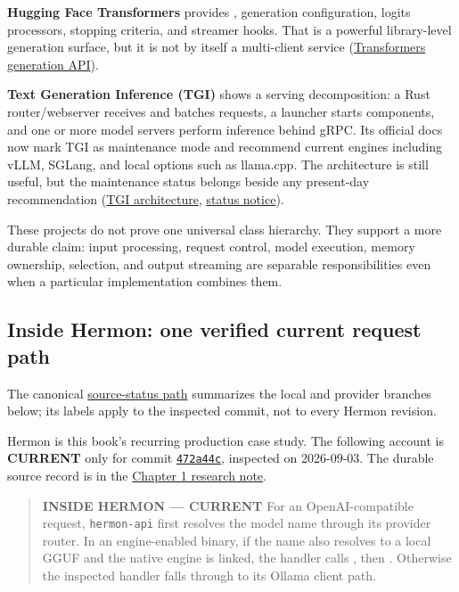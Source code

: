 \documentclass[
  10pt,
]{article}
\begin{document}
\textbf{Hugging Face Transformers} provides
\texttt{}, generation configuration,
logits processors, stopping criteria, and streamer hooks. That is a
powerful library-level generation surface, but it is not by itself a
multi-client service
(\href{https://huggingface.co/docs/transformers/main_classes/text_generation}{Transformers
generation API}).

\textbf{Text Generation Inference (TGI)} shows a serving decomposition:
a Rust router/webserver receives and batches requests, a launcher starts
components, and one or more model servers perform inference behind gRPC.
Its official docs now mark TGI as maintenance mode and recommend current
engines including vLLM, SGLang, and local options such as llama.cpp. The
architecture is still useful, but the maintenance status belongs beside
any present-day recommendation
(\href{https://huggingface.co/docs/text-generation-inference/architecture}{TGI
architecture},
\href{https://huggingface.co/docs/text-generation-inference/index}{status
notice}).

These projects do not prove one universal class hierarchy. They support
a more durable claim: input processing, request control, model
execution, memory ownership, selection, and output streaming are
separable responsibilities even when a particular implementation
combines them.

\subsection{Inside Hermon: one verified current request
path}\label{inside-hermon-one-verified-current-request-path}

The canonical
\href{https://github.com/hermonai/inside-the-llm-engine/blob/astra-visual-rewrite/diagrams/runtime/hermon-current-request-path.txt}{source-status
path} summarizes the local and provider branches below; its labels apply
to the inspected commit, not to every Hermon revision.

Hermon is this book's recurring production case study. The following
account is \textbf{CURRENT} only for commit
\href{https://github.com/hermonai/hermon/commit/472a44cdb511b2dae6c9569e59543db8f8350b25}{\texttt{472a44c}},
inspected on 2026-09-03. The durable source record is in the
\href{https://github.com/hermonai/inside-the-llm-engine/blob/astra-visual-rewrite/research/part-01/chapter-01-the-missing-half-of-ai.md}{Chapter
1 research note}.

\begin{quote}
\textbf{INSIDE HERMON --- CURRENT} For an OpenAI-compatible request,
\texttt{hermon-api} first resolves the model name through its provider
router. In an engine-enabled binary, if the name also resolves to a
local GGUF and the native engine is linked, the handler calls
\texttt{}, then
\texttt{}.
Otherwise the inspected handler falls through to its Ollama client path.
\end{quote}
\end{document}
